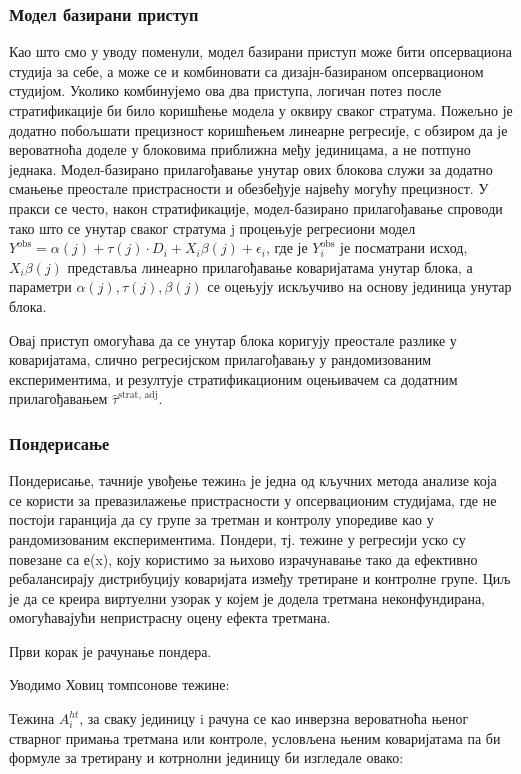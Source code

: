\documentclass[12pt, a4paper]{article}
\begin{document}
\subsubsection{Модел базирани приступ}
Као што смо у уводу поменули, модел базирани приступ може бити опсервациона студија за себе, а може се и комбиновати са дизајн-базираном опсервационом студијом. Уколико комбинујемо ова два приступа, логичан потез после стратификације би било коришћење модела у оквиру сваког стратума. Пожељно је додатно побољшати прецизност коришћењем линеарне регресије, с обзиром да је вероватноћа доделе у блоковима приближна међу јединицама, а не потпуно једнака.  Модел-базирано прилагођавање унутар ових блокова служи за додатно смањење преостале пристрасности и обезбеђује највећу могућу прецизност.  У пракси се често, након стратификације, модел-базирано прилагођавање спроводи тако што се унутар сваког стратума j процењује регресиони модел $Y^{\text{obs}} = \alpha(j) + \tau(j) \cdot D_i + X_i \beta(j) + \epsilon_i$,  где је $Y_i^{\text{obs}}$ је посматрани исход, $X_i\beta(j)$ представља линеарно прилагођавање коваријатама унутар блока, а параметри $\alpha(j), \tau(j), \beta(j)$ се оцењују искључиво на основу јединица унутар блока.

Овај приступ омогућава да се унутар блока коригују преостале разлике у коваријатама, слично регресијском прилагођавању у рандомизованим експериментима, и резултује стратификационим оцењивачем са додатним прилагођавањем $\hat{\tau}^{\text{strat, adj}}$.
\subsubsection{Пондерисање}
\par Пондерисање, тачније увођење тежинa је једна од кључних метода анализе која се користи за превазилажење пристрасности у опсервационим студијама, где не постоји гаранција да су групе за третман и контролу упоредиве као у рандомизованим експериментима. Пондери, тј. тежине у регресији уско су повезане са е(x), коју користимо за њихово израчунавање тако да ефективно ребалансирају дистрибуцију коваријата између третиране и контролне групе. Циљ је да се креира виртуелни узорак у којем је додела третмана неконфундирана, омогућавајући непристрасну оцену ефекта третмана.

Први корак је рачунање пондера. 

Уводимо Ховиц томпсонове тежине: 

Тежина $A_i^{ht}$, за сваку јединицу i рачуна се као инверзна вероватноћа њеног стварног примања третмана или контроле, условљена њеним коваријатама па би формуле за третирану и котрнолни јединицу би изгледале овако:
\end{document}
